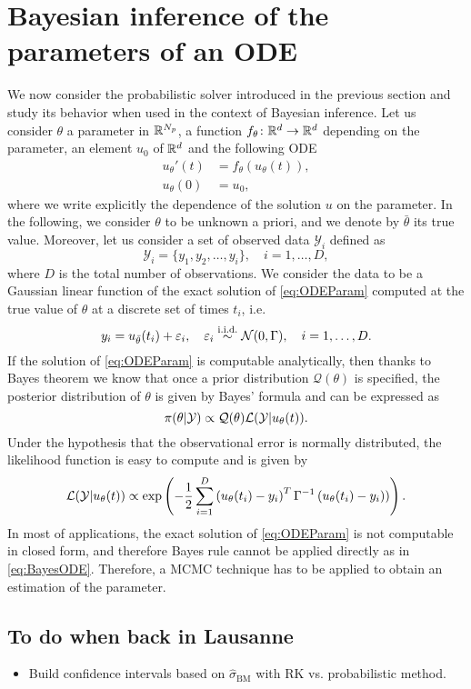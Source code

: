 \section{Bayesian inference of the parameters of an ODE}\label{sec:THREE}

We now consider the probabilistic solver introduced in the previous section and study its behavior when used in the context of Bayesian inference. Let us consider $\theta$ a parameter in $\mathbb{R}^{N_p}$, a function $f_\theta\colon \mathbb{R}^d \to \mathbb{R}^d$ depending on the parameter, an element $u_0$ of $\mathbb{R}^d$ and the following ODE 
\begin{equation}\label{eq:ODEParam}
\begin{aligned}
	u_\theta' (t) &= f_\theta(u_\theta(t)),\\
			 u_\theta(0) &= u_0,
\end{aligned}
\end{equation}
where we write explicitly the dependence of the solution $u$ on the parameter. In the following, we consider $\theta$ to be unknown a priori, and we denote by $\bar \theta$ its true value. Moreover, let us consider a set of observed data $\mathcal{Y}_i$ defined as
\begin{equation}
	\mathcal{Y}_i = \{y_1, y_2, \ldots, y_i\}, \quad i = 1, \ldots, D,
\end{equation} 
where $D$ is the total number of observations. We consider the data to be a Gaussian linear function of the exact solution of \eqref{eq:ODEParam} computed at the true value of $\theta$ at a discrete set of times $t_i$, i.e.
\begin{equation}
	y_i = u_{\bar\theta}(t_i) + \varepsilon_i, \quad \varepsilon_i \stackrel{\text{i.i.d.}}{\sim} \mathcal{N}(0, \Gamma), \quad i = 1, \ldots, D.
\end{equation} 
If the solution of \eqref{eq:ODEParam} is computable analytically, then thanks to Bayes theorem we know that once a prior distribution $\mathcal{Q}(\theta)$ is specified, the posterior distribution of $\theta$ is given by Bayes' formula and can be expressed as
\begin{equation}\label{eq:BayesODE}
	\pi(\theta|\mathcal Y) \propto \mathcal{Q}(\theta) \mathcal{L}(\mathcal Y|u_\theta(t)).
\end{equation}
 Under the hypothesis that the observational error is normally distributed, the likelihood function is easy to compute and is given by
 \begin{equation}\label{eq:likelihood}
	 \mathcal{L}(\mathcal Y|u_\theta(t)) \propto \exp\left(-\frac{1}{2}\sum_{i=1}^{D}\left(u_\theta(t_i) - y_i\right)^T \Gamma^{-1} \left(u_\theta(t_i) - y_i) \right)\right).
 \end{equation}
 In most of applications, the exact solution of \eqref{eq:ODEParam} is not computable in closed form, and therefore Bayes rule cannot be applied directly as in \eqref{eq:BayesODE}. Therefore, a MCMC technique has to be applied to obtain an estimation of the parameter.
 




\subsection{To do when back in Lausanne}

\begin{itemize}
	\item Build confidence intervals based on $\hat \sigma_{\mathrm{BM}}$ with RK vs. probabilistic method.
\end{itemize}
